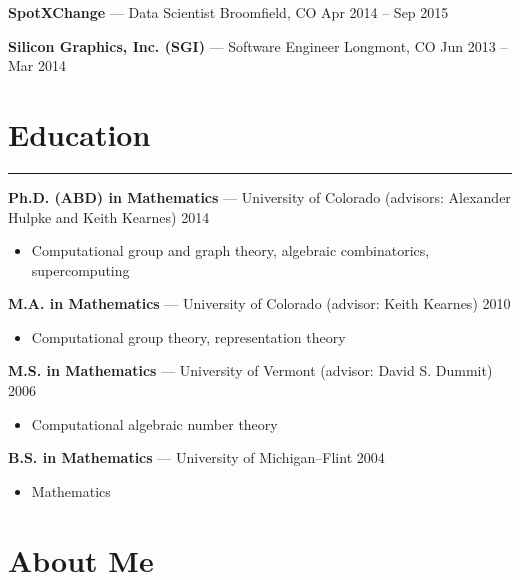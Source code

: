 \documentclass[letterpaper,10pt]{article}
\newcommand{\mblue}{\color{darkblue}}
\begin{document}
\pagebreak


\vspace{1pc}
\textbf{SpotXChange} --- Data Scientist
\smallbreak Broomfield, CO \textbar{} Apr 2014 -- Sep 2015

\vspace{1pc}
\textbf{Silicon Graphics, Inc. (SGI)} --- Software Engineer
\smallbreak Longmont, CO \textbar{} Jun 2013 -- Mar 2014



\section*{\mblue Education}

\vspace{-2.15pc}
{\hfill\mblue\rule{5.845in}{0.02cm}}

\vspace{1pc}
\textbf{Ph.D. (ABD) in Mathematics} --- University of Colorado (advisors: Alexander Hulpke and Keith Kearnes) \textbar{} 2014

\begin{itemize}
    \item Computational group and graph theory, algebraic combinatorics, supercomputing
\end{itemize}

\bigbreak\textbf{M.A. in Mathematics} --- University of Colorado (advisor: Keith Kearnes) \textbar{} 2010

\begin{itemize}
    \item Computational group theory, representation theory
\end{itemize}

\bigbreak\textbf{M.S. in Mathematics} --- University of Vermont (advisor: David S. Dummit) \textbar{} 2006

\begin{itemize}
    \item Computational algebraic number theory
\end{itemize}

\bigbreak\textbf{B.S. in Mathematics} --- University of Michigan--Flint \textbar{} 2004

\begin{itemize}
    \item Mathematics
\end{itemize}


\section*{\mblue About Me}
\end{document}
